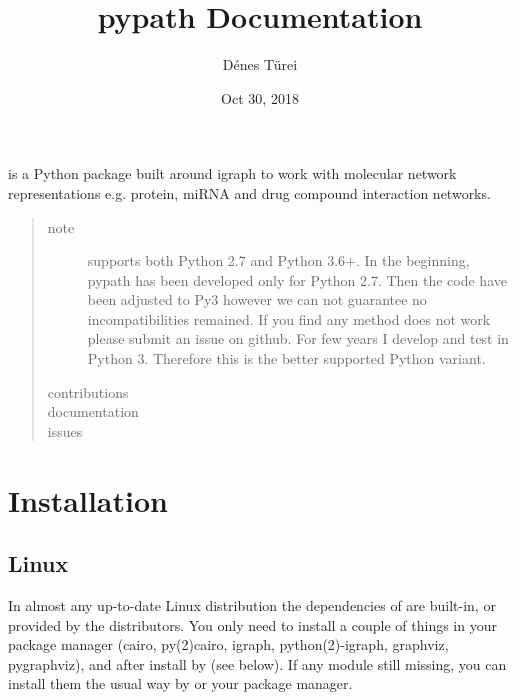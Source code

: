 \documentclass[letterpaper,10pt,english]{sphinxmanual}
\title{pypath Documentation}
\date{Oct 30, 2018}
\author{Dénes Türei}
\begin{document}
\maketitle
\sphinxtableofcontents
{}\label{\detokenize{index::doc}}


 is a Python package built around igraph to work with molecular
network representations e.g. protein, miRNA and drug compound interaction
networks.
\begin{quote}\begin{description}
\item[{note}] \leavevmode
{} supports both Python 2.7 and Python 3.6+. In the beginning,
pypath has been developed only for Python 2.7. Then the code have been
adjusted to Py3 however we can not guarantee no incompatibilities
remained. If you find any method does not work please submit an issue on
github. For few years I develop and test  in Python 3. Therefore
this is the better supported Python variant.

\item[{contributions}] \leavevmode
{}

\item[{documentation}] \leavevmode
{}

\item[{issues}] \leavevmode
{}

\end{description}\end{quote}


\chapter{Installation}
\label{\detokenize{installation:installation}}\label{\detokenize{installation::doc}}

\section{Linux}
\label{\detokenize{installation:linux}}
In almost any up-to-date Linux distribution the dependencies of  are
built-in, or provided by the distributors. You only need to install a couple
of things in your package manager (cairo, py(2)cairo, igraph,
python(2)-igraph, graphviz, pygraphviz), and after install  by 
(see below). If any module still missing, you can install them the usual way
by  or your package manager.
\end{document}
